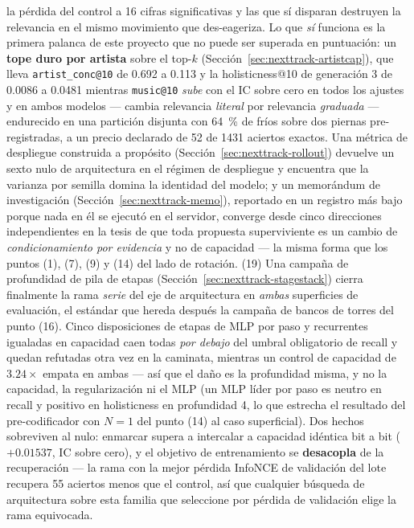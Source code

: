 \documentclass[11pt]{article}
\begin{document}
la pérdida del control a \num{16} cifras significativas y las que sí disparan
destruyen la relevancia en el mismo movimiento que des-eageriza. Lo que \emph{sí}
funciona es la primera palanca de este proyecto que no puede ser superada en
puntuación: un \textbf{tope duro por artista} sobre el top-$k$
(Sección~\ref{sec:nexttrack-artistcap}), que lleva \texttt{artist\_conc@10} de
\num{0.692} a \num{0.113} y la holisticness@10 de generación 3 de \num{0.0086} a
\num{0.0481} mientras \texttt{music@10} \emph{sube} con el IC sobre cero en todos
los ajustes y en ambos modelos --- cambia relevancia \emph{literal} por relevancia
\emph{graduada} --- endurecido en una partición disjunta con \SI{64}{\percent} de
fríos sobre dos piernas pre-registradas, a un precio declarado de \num{52} de
\num{1431} aciertos exactos. Una métrica de despliegue construida a propósito
(Sección~\ref{sec:nexttrack-rollout}) devuelve un sexto nulo de arquitectura en el
régimen de despliegue y encuentra que la varianza por semilla domina la identidad
del modelo; y un memorándum de investigación
(Sección~\ref{sec:nexttrack-memo}), reportado en un registro más bajo porque nada en
él se ejecutó en el servidor, converge desde cinco direcciones independientes en la
tesis de que toda propuesta superviviente es un cambio de
\emph{condicionamiento por evidencia} y no de capacidad --- la misma forma que los
puntos (1), (7), (9) y (14) del lado de rotación.
(19) Una campaña de profundidad de pila de etapas
(Sección~\ref{sec:nexttrack-stagestack}) cierra finalmente la rama \emph{serie} del
eje de arquitectura en \emph{ambas} superficies de evaluación, el estándar que
hereda después la campaña de bancos de torres del punto (16). Cinco disposiciones de
etapas de MLP por paso y recurrentes igualadas en capacidad caen todas \emph{por
debajo} del umbral obligatorio de recall y quedan refutadas otra vez en la caminata,
mientras un control de capacidad de $\num{3.24}\times$ empata en ambas --- así que el
daño es la profundidad misma, y no la capacidad, la regularización ni el MLP (un MLP
líder por paso es neutro en recall y positivo en holisticness en profundidad 4, lo
que estrecha el resultado del pre-codificador con $N=1$ del punto (14) al caso
superficial). Dos hechos sobreviven al nulo: enmarcar supera a intercalar a
capacidad idéntica bit a bit ($+\num{0.01537}$, IC sobre cero), y el objetivo de
entrenamiento se \textbf{desacopla} de la recuperación --- la rama con la mejor
pérdida InfoNCE de validación del lote recupera \num{55} aciertos menos que el
control, así que cualquier búsqueda de arquitectura sobre esta familia que
seleccione por pérdida de validación elige la rama equivocada.
\end{document}
